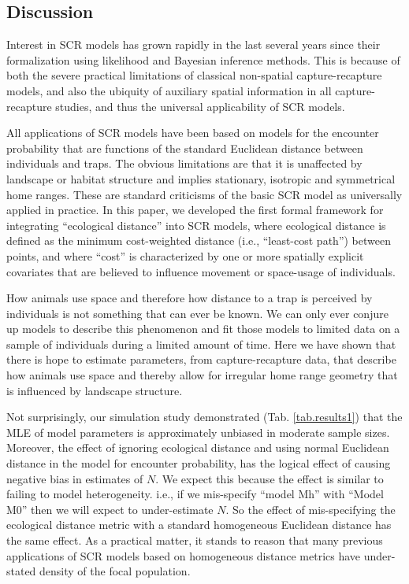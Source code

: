 \documentclass[12pt]{article}
\begin{document}
\begin{spacing}{1.8}
\section{Discussion}

Interest in SCR models has grown rapidly in the last several years
since their formalization using likelihood
\citep{borchers_efford:2008} and Bayesian \citep{royle_young:2008}
inference methods. This is because of both the severe practical
limitations of classical non-spatial capture-recapture models, and
also the ubiquity of auxiliary spatial information in all
capture-recapture studies, and thus the universal applicability of SCR
models.

All applications of SCR models have been based on models for the
encounter probability that are functions of the standard Euclidean
distance between individuals and traps. The obvious limitations are
that it is unaffected by landscape or habitat structure and implies
stationary, isotropic and symmetrical home ranges. These are standard
criticisms of the basic SCR model as universally applied in practice.
In this paper, we developed the first formal framework for integrating
``ecological distance'' into SCR models, where ecological distance is
defined as the minimum cost-weighted distance (i.e., ``least-cost
path'') between points, and where ``cost'' is characterized by one or
more spatially explicit covariates that are believed to influence
movement or space-usage of individuals.

How animals use space and therefore how distance to a trap is
perceived by individuals is not something that can ever be known. We
can only ever conjure up models to describe this phenomenon and fit
those models to limited data on a sample of individuals during a
limited amount of time.  Here we have shown that there is hope to
estimate parameters, from capture-recapture data, that describe how
animals use space and thereby allow for irregular home range geometry
that is influenced by landscape structure.

Not surprisingly, our simulation study demonstrated
(Tab. \ref{tab.results1}) that the MLE of model parameters is
approximately unbiased in moderate sample sizes. Moreover, the effect
of ignoring ecological distance and using normal Euclidean distance in
the model for encounter probability, has the logical effect of causing
negative bias in estimates of $N$.  We expect this because the effect
is similar to failing to model heterogeneity. i.e., if we mis-specify
``model Mh'' \citep{otis_etal:1978} with ``Model M0''
\citep{otis_etal:1978} then we will expect to under-estimate $N$. So
the effect of mis-specifying the ecological distance metric with a
standard homogeneous Euclidean distance has the same effect. As a
practical matter, it stands to reason that many previous applications
of SCR models based on homogeneous distance metrics have under-stated
density of the focal population.


\end{spacing}
\end{document}
